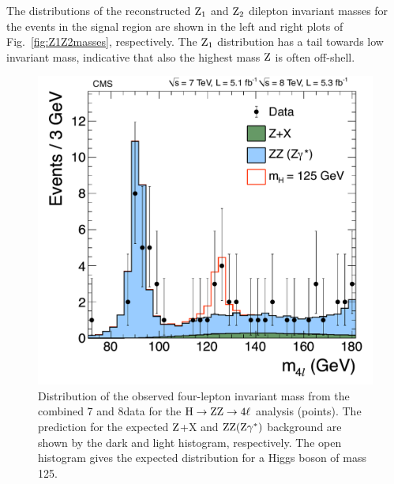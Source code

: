 \documentclass[12pt,twoside,a4paper,cmspaper,final,collab]{cms-tdr}
\begin{document}
The distributions of the reconstructed $\mathrm{Z}_1$ and $\mathrm{Z}_2$ dilepton invariant masses for the events in the
signal region are shown in the left and right plots of Fig.~\ref{fig:Z1Z2masses}, respectively.
The $\mathrm{Z}_1$ distribution has a tail towards low invariant mass,
indicative that also the highest mass $\mathrm{Z}$ is often off-shell.



\begin{figure}[htbp]
   \begin{center}
     \includegraphics[width=0.7\linewidth]{figures/HZZ_m4l_70_180_Higgs125_3GeV.pdf}
     \caption{
     Distribution of the observed four-lepton invariant mass from the combined 7 and 8\TeV data
for the $\mathrm{H} \to \mathrm{Z}\mathrm{Z}\to 4\ell$ analysis (points).
The prediction for the expected $\mathrm{Z}$+X and $\mathrm{Z}\mathrm{Z}(\mathrm{Z}\gamma^*)$ background are shown by the dark and
light histogram, respectively. The open histogram gives the expected distribution for a Higgs boson of mass 125\GeV.
     }
\label{fig:ZZmass}
   \end{center}
\end{figure}
\end{document}
